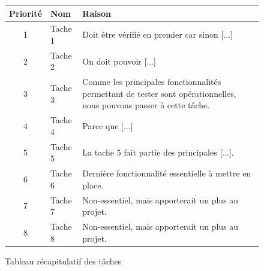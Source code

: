 \begin{figure}[!h]
\begin{center}
\begin{tabularx}{17cm}{|c|p{6cm}|X|}
  \hline
  Priorité & Nom & Raison\\
  \hline
  1 & Tache 1 & Doit être vérifié en premier car sinon [...] \tabularnewline
  2 & Tache 2 & On doit pouvoir [...] \tabularnewline
  3 & Tache 3 & Comme les principales fonctionnalités permettant de tester sont opérationnelles, nous pouvons passer à cette tâche. \tabularnewline
  4 & Tache 4 & Parce que [...] \tabularnewline
  5 & Tache 5 & La tache 5 fait partie des principales [...]. \tabularnewline
  6 & Tache 6 & Dernière fonctionnalité essentielle à mettre en place. \tabularnewline
  7 & Tache 7 & Non-essentiel, mais apporterait un plus au projet. \tabularnewline
  8 & Tache 8 & Non-essentiel, mais apporterait un plus au projet. \tabularnewline
  \hline
\end{tabularx}
\end{center}
\caption{Tableau récapitulatif des tâches}
\end{figure}